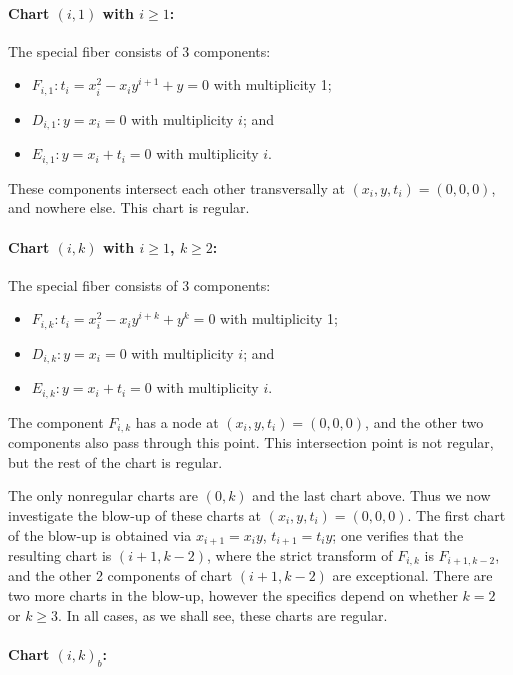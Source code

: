 \documentclass[pagesize,paper=letter]{scrartcl}
\theoremstyle{plain}
\theoremstyle{definition}
\theoremstyle{remark}
\begin{document}
\paragraph{Chart $(i, 1)$ with $i \geq 1$:}
\label{sec:case-i-1}

The special fiber consists of 3 components:
\begin{itemize}
    \item $F_{i,1}: t_i = x_i^2 - x_iy^{i+1} + y = 0$ with multiplicity 1;
    \item $D_{i,1}: y = x_i = 0$ with multiplicity $i$; and
    \item $E_{i,1}: y = x_i + t_i = 0$ with multiplicity $i$.
\end{itemize}
These components intersect each other transversally at $(x_i, y, t_i) = (0,0,0)$, and nowhere else. This chart is regular.



\paragraph{Chart $(i, k)$ with $i\geq 1$, $k\geq 2$:}
\label{sec:higher-i-k}

The special fiber consists of 3 components:
\begin{itemize}
    \item $F_{i,k}: t_i = x_i^2 - x_iy^{i+k} + y^k = 0$ with multiplicity 1;
    \item $D_{i,k}: y = x_i = 0$ with multiplicity $i$; and
    \item $E_{i,k}: y = x_i + t_i = 0$ with multiplicity $i$.
\end{itemize}
The component $F_{i,k}$ has a node at $(x_i,y,t_i) = (0,0,0)$, and the other two components also pass through this point. This intersection point is not regular, but the rest of the chart is regular.

The only nonregular charts are $(0,k)$ and the last chart above. Thus we now investigate the blow-up of these charts at $(x_i,y,t_i) = (0,0,0)$. The first chart of the blow-up is obtained via $x_{i+1} = x_i y$, $t_{i+1} = t_i y$; one verifies that the resulting chart is $(i+1, k-2)$, where the strict transform of $F_{i,k}$ is $F_{i+1, k-2}$, and the other 2 components of chart $(i + 1, k-2)$ are exceptional. There are two more charts in the blow-up, however the specifics depend on whether $k=2$ or $k \geq 3$. In all cases, as we shall see, these charts are regular.

\paragraph{Chart $(i,k)_b$:}
\label{sec:chart-i-k_b}
\end{document}
